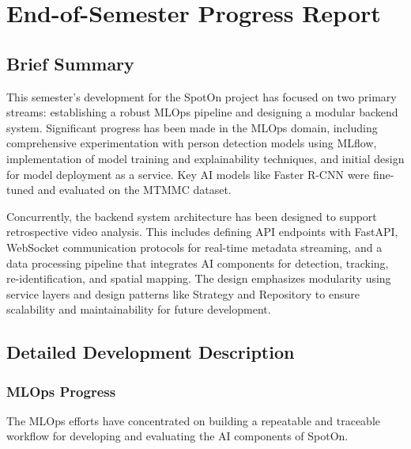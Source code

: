 
\chapter*{End-of-Semester Progress Report} %
\label{chap:progress_report}

\section*{Brief Summary}
\label{sec:progress_summary}
This semester's development for the SpotOn project has focused on two primary streams: establishing a robust MLOps pipeline and designing a modular backend system. Significant progress has been made in the MLOps domain, including comprehensive experimentation with person detection models using MLflow, implementation of model training and explainability techniques, and initial design for model deployment as a service. Key AI models like Faster R-CNN were fine-tuned and evaluated on the MTMMC dataset.

Concurrently, the backend system architecture has been designed to support retrospective video analysis. This includes defining API endpoints with FastAPI, WebSocket communication protocols for real-time metadata streaming, and a data processing pipeline that integrates AI components for detection, tracking, re-identification, and spatial mapping. The design emphasizes modularity using service layers and design patterns like Strategy and Repository to ensure scalability and maintainability for future development.

\section*{Detailed Development Description}
\label{sec:progress_detailed_development}

\subsection*{MLOps Progress}
\label{subsec:progress_mlops}
The MLOps efforts have concentrated on building a repeatable and traceable workflow for developing and evaluating the AI components of SpotOn.

